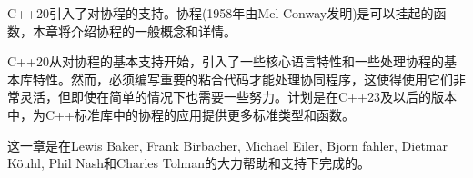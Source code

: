 C++20引入了对协程的支持。协程(1958年由Mel Conway发明)是可以挂起的函数，本章将介绍协程的一般概念和详情。

C++20从对协程的基本支持开始，引入了一些核心语言特性和一些处理协程的基本库特性。然而，必须编写重要的粘合代码才能处理协同程序，这使得使用它们非常灵活，但即使在简单的情况下也需要一些努力。计划是在C++23及以后的版本中，为C++标准库中的协程的应用提供更多标准类型和函数。

这一章是在Lewis Baker, Frank Birbacher, Michael Eiler, Bjorn fahler, Dietmar K{\"o}uhl, Phil Nash和Charles Tolman的大力帮助和支持下完成的。